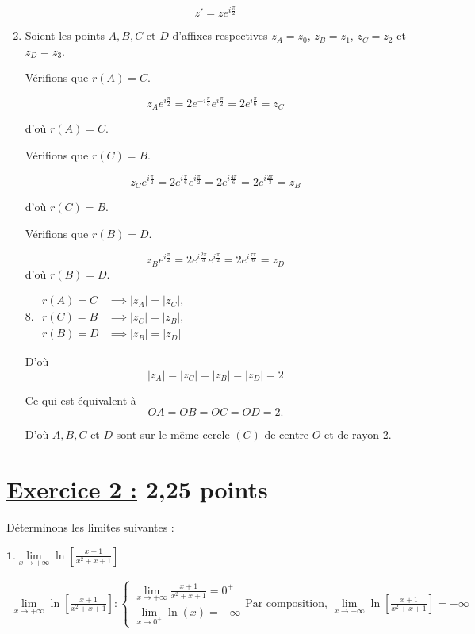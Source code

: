 \documentclass[12pt,a4paper]{article}
\begin{document}
\begin{enumerate}
          \[
              z' = z e^{i \frac{\pi}{2}}
          \]

    \item
          Soient les points $A, B, C$ et $D$ d’affixes respectives $z_A = z_0$, $z_B = z_1$, $z_C = z_2$ et $z_D = z_3$.

          Vérifions que $r(A) = C$.

          \[
              z_A e^{i \frac{\pi}{2}} = 2e^{-i \frac{\pi}{3}} e^{i \frac{\pi}{2}} = 2e^{i \frac{\pi}{6}} = z_C
          \]

          d’où $r(A) = C$.

          Vérifions que $r(C) = B$.

          \[
              z_C e^{i \frac{\pi}{2}} = 2e^{i \frac{\pi}{6}} e^{i \frac{\pi}{2}} = 2e^{i \frac{4\pi}{6}} = 2e^{i \frac{2\pi}{3}} = z_B
          \]

          d’où $r(C) = B$.

          Vérifions que $r(B) = D$.

          \[
              z_B e^{i \frac{\pi}{2}} = 2e^{i \frac{2\pi}{3}} e^{i \frac{\pi}{2}} = 2e^{i \frac{7\pi}{6}} = z_D
          \]
          d’où \( r(B) = D \).

          8. \(
          \begin{aligned}
              r(A) = C & \implies |z_A| = |z_C|, \\
              r(C) = B & \implies |z_C| = |z_B|, \\
              r(B) = D & \implies |z_B| = |z_D|
          \end{aligned}
          \)

          D’où
          \[
              |z_A| = |z_C| = |z_B| = |z_D| = 2
          \]

          Ce qui est équivalent à
          \[
              OA = OB = OC = OD = 2.
          \]

          D’où \( A, B, C \) et \( D \) sont sur le même cercle \( (C) \) de centre \( O \) et de rayon 2.
\end{enumerate}
\section*{\underline{Exercice 2 :} 2,25 points }
Déterminons les limites suivantes :

\(\textbf{1.} \lim\limits_{x \to +\infty} \ln\left[ \frac{x+1}{x^2 + x + 1}\right]  \quad \)

\(
\begin{aligned}
    \lim\limits_{x \to +\infty} \ln\left[ \frac{x+1}{x^2 + x + 1}\right]:
    \begin{cases}
        \lim\limits_{x \to +\infty} \frac{x+1}{x^2 + x + 1}=0^+ \\
        \lim\limits_{x \to 0^+}\ln(x)=-\infty
    \end{cases}\text{Par composition, }\lim\limits_{x \to +\infty} \ln\left[ \frac{x+1}{x^2 + x + 1}\right]=-\infty
\end{aligned}
\)
\end{document}
